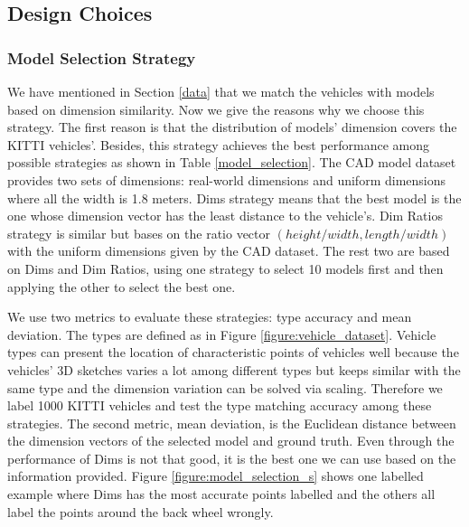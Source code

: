 \subsection{Design Choices}
\label{d_choices}

\subsubsection{Model Selection Strategy}
We have mentioned in Section \ref{data} that we match the vehicles with models based on dimension similarity. Now we give the reasons why we choose this strategy. The first reason is that the distribution of models' dimension covers the KITTI vehicles'. Besides, this strategy achieves the best performance among possible strategies as shown in Table \ref{model_selection}. The CAD model dataset provides two sets of dimensions: real-world dimensions and  uniform dimensions where all the width is 1.8 meters. Dims strategy means that the best model is the one whose dimension vector has the least distance to the vehicle's. Dim Ratios strategy is similar but bases on the ratio vector $(height/width, length/width)$ with the uniform dimensions given by the CAD dataset. The rest two are based on Dims and Dim Ratios, \ie using one strategy to select 10 models first and then applying the other to select the best one.

We use two metrics to evaluate these strategies: type accuracy and mean deviation. The types are defined as in Figure \ref{figure:vehicle_dataset}. Vehicle types can present the location of characteristic points of vehicles well because the vehicles' 3D sketches varies a lot among different types but keeps similar with the same type and the dimension variation can be solved via scaling. Therefore we label 1000 KITTI vehicles and test the type matching accuracy among these strategies. The second metric, mean deviation, is the Euclidean distance between the dimension vectors of the selected model and ground truth. Even through the performance of Dims is not that good, it is the best one we can use based on the information provided. Figure \ref{figure:model_selection_s} shows one labelled example where Dims has the most accurate points labelled and the others all label the points around the back wheel wrongly.

\renewcommand{\arraystretch}{1.2}
\begin{table}[ht]
	\centering
	\caption{Performance of four model selection strategies}
	\label{model_selection}
\end{table}


